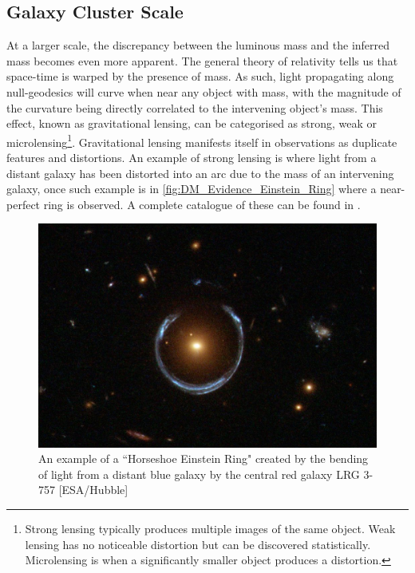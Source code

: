 \subsection{Galaxy Cluster Scale}
\par
At a larger scale, the discrepancy between the luminous mass and the inferred mass becomes even more apparent.
The general theory of relativity tells us that space-time is warped by the presence of mass.
As such, light propagating along null-geodesics will curve when near any object with mass, with the magnitude of the curvature being directly correlated to the intervening object's mass.
This effect, known as gravitational lensing, can be categorised as strong, weak or microlensing\footnote{Strong lensing typically produces multiple images of the same object. Weak lensing has no noticeable distortion but can be discovered statistically. Microlensing is when a significantly smaller object produces a distortion.}. 
Gravitational lensing manifests itself in observations as duplicate features and distortions.
An example of strong lensing is where light from a distant galaxy has been distorted into an arc due to the mass of an intervening galaxy, once such example is in \autoref{fig:DM_Evidence_Einstein_Ring}  where a near-perfect ring is observed.
A complete catalogue of these can be found in \cite{einstein_ring_discovery_ref}.

\begin{figure}%
    \centering
    \includegraphics[scale=0.4]{Figures/DarkMatterEvidence/Einstein_Ring_from_Hubble.JPG}
    \caption{An example of a ``Horseshoe Einstein Ring" created by the bending of light from a distant blue galaxy by the central red galaxy LRG 3-757 [ESA/Hubble]}
    \label{fig:DM_Evidence_Einstein_Ring}
\end{figure}

